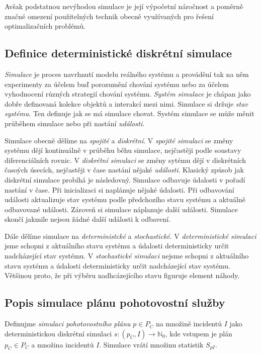 Avšak podstatnou nevýhodou simulace je její výpočetní náročnost a poměrně značné omezení použitelných technik obecně využívaných pro řešení optimalizačních problémů.

\subsection{Definice deterministické diskrétní simulace}

\textit{Simulace} je proces navrhnutí modelu reálného systému a provádění tak na něm experimenty za účelem buď porozumění chování systému
nebo za účelem vyhodnocení různých strategií chování systému.
\textit{Systém simulace} je chápan jako dobře definovaná kolekce objektů a interakcí mezi nimi.
Simulace si držuje \textit{stav systému}. Ten definuje jak se má simulace chovat.
Systém simulace se může měnit průběhem simulace nebo při nastání \textit{události}.

Simulace obecně dělíme na \textit{spojité} a \textit{diskrétní}.
V \textit{spojité simulaci} se změny systému dějí kontinuálně v průběhu běhu simulace, nejčastěji podle soustavy diferenciálních rovnic.
V \textit{diskrétní simulaci} se změny sytému dějí v diskrétních časoých úsecích, nejčastěji v čase nastání nějaké \textit{události}.
Klasický způsob jak diskrétní simulace probíhá je následovný.
Simulace odbavuje údalosti v pořadí nastání v čase.
Při inicializaci si naplánuje nějaké údalosti.
Při odbavování události aktualizuje stav systému podle předchozího stavu systému a aktuálně odbavované události. Zároveň si simulace náplanuje další události. 
Simulace skončí jakmile nejsou žádné další události k odbavení.

Dále dělíme simulace na \textit{deterministcké} a \textit{stochastické}.
V \textit{deterministické simulaci} jsme schopni z aktuálního stavu systému a údalosti deterministicky určit nadcházející stav systému.
V \textit{stochastické simulaci} nejsme schopni z aktuálního stavu systému a údalosti deterministicky určit nadcházející stav systému.
Většinou proto, že při výběru nadhcázejícího stavu figuruje element náhody.
\cite{SimulaceBook}

\subsection{Popis simulace plánu pohotovostní služby}\label{kap:definiceSimulace}

\begin{definice}
  Definujme \textit{simulaci pohotovostního plánu} $p \in P_C$ na množině incidentů $I$ jako deterministickou diskrétní simulaci
  $s \colon (p_C, I) \rightarrow \mathbb{N}_0$, kde vstupem je plán $p_C \in P_C$ a množina incidentů $I$.
  Simulace vrátí množinu statistik $S_{pI}$.
\end{definice}

